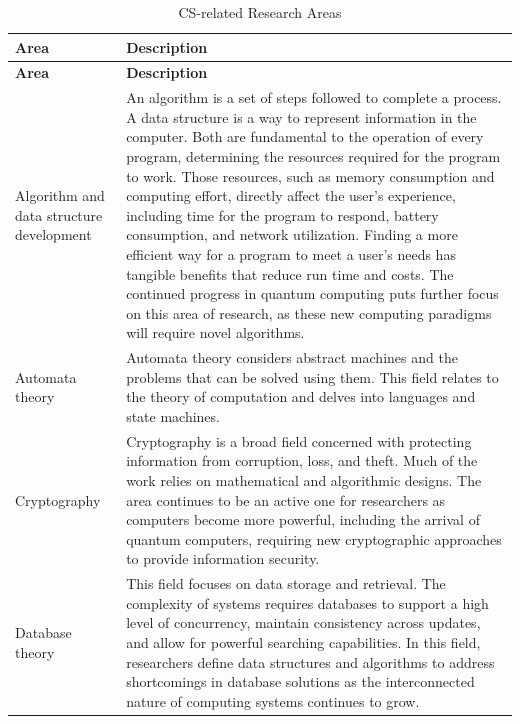 
\begin{longtable}[H]{p{.8in}|p{3.6in}}
	\caption{CS-related Research Areas}
	\label{tab:table1}\\
	\textbf{Area} & \textbf{Description}\\
	\hline
	\endfirsthead
	\textbf{Area} & \textbf{Description}\\
	\endhead
	\Tstrut Algorithm and data structure development & An algorithm is a set of steps followed to complete a process. A data structure is a way to represent information in the computer. Both are fundamental to the operation of every program, determining the resources required for the program to work. Those resources, such as memory consumption and computing effort, directly affect the user's experience, including time for the program to respond, battery consumption, and network utilization. Finding a more efficient way for a program to meet a user's needs has tangible benefits that reduce run time and costs. The continued progress in quantum computing puts further focus on this area of research, as these new computing paradigms will require novel algorithms.\\
	\hline
	\Tstrut Automata theory & Automata theory considers abstract machines and the problems that can be solved using them. This field relates to the theory of computation and delves into languages and state machines.\\
	\hline
	\Tstrut Cryptography & Cryptography is a broad field concerned with protecting information from corruption, loss, and theft. Much of the work relies on mathematical and algorithmic designs. The area continues to be an active one for researchers as computers become more powerful, including the arrival of quantum computers, requiring new cryptographic approaches to provide information security.\\
	\hline
	\Tstrut Database theory & This field focuses on data storage and retrieval. The complexity of systems requires databases to support a high level of concurrency, maintain consistency across updates, and allow for powerful searching capabilities. In this field, researchers define data structures and algorithms to address shortcomings in database solutions as the interconnected nature of computing systems continues to grow.\\

\end{longtable}
